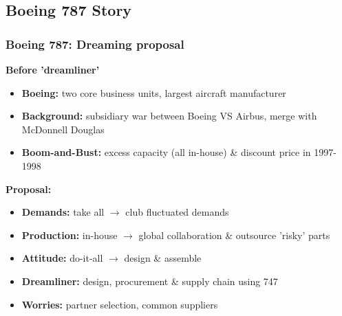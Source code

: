 \documentclass[10pt,presentation]{beamer}
\begin{document}
\subsection{Boeing 787 Story}
\begin{frame}
  \frametitle{Boeing 787: Dreaming proposal}

    \textbf{Before 'dreamliner'}
    \begin{itemize}
      \item \textbf{Boeing:} two core business units, largest aircraft manufacturer
      \item \textbf{Background:} subsidiary war between \alert{Boeing} VS \alert{Airbus}, merge with McDonnell Douglas
      \item \textbf{Boom-and-Bust:} excess \alert{capacity }(all in-house) \& \alert{discount price} in 1997-1998
    \end{itemize}

  \NextLine
  \textbf{Proposal:}
  \begin{itemize}
      \item \textbf{Demands:} take all $\rightarrow$ \alert{club fluctuated} demands
      \item \textbf{Production:} in-house $\rightarrow$ \alert{global collaboration} \& outsource 'risky' parts
      \item \textbf{Attitude:} do-it-all $\rightarrow$ \alert{design} \& \alert{assemble}
      \item \textbf{Dreamliner:} design, procurement \& supply chain using 747
      \item \textbf{Worries:} partner selection, common suppliers
  \end{itemize}

\end{frame}
\end{document}
